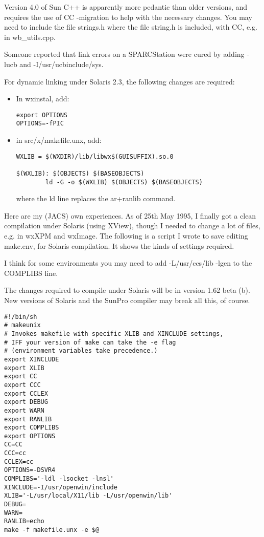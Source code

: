 Version 4.0 of Sun C++ is apparently more pedantic than
older versions, and requires the use of CC -migration to
help with the necessary changes. You may need to include the file strings.h
where the file string.h is included, with CC, e.g. in wb\_utils.cpp.

Someone reported that link errors on a SPARCStation were
cured by adding -lucb and -I/usr/ucbinclude/sys.

For dynamic linking under Solaris 2.3, the following
changes are required:

\begin{itemize}
\item In wxinstal, add:

\begin{verbatim}
export OPTIONS
OPTIONS=-fPIC
\end{verbatim}%
\item in src/x/makefile.unx, add:

\begin{verbatim}
WXLIB = $(WXDIR)/lib/libwx$(GUISUFFIX).so.0

$(WXLIB): $(OBJECTS) $(BASEOBJECTS)
      	ld -G -o $(WXLIB) $(OBJECTS) $(BASEOBJECTS)
\end{verbatim}

where the ld line replaces the ar+ranlib command.
\end{itemize}

Here are my (JACS) own experiences. As of 25th May 1995, I finally got a clean
compilation under Solaris (using XView), though I needed to change a lot
of files, e.g. in wxXPM and wxImage. The following is a script I wrote
to save editing make.env, for Solaris compilation. It shows the kinds of
settings required.

I think for some environments you may need to add -L/usr/ccs/lib -lgen
to the COMPLIBS line.

The changes required to compile under Solaris will be in version 1.62 beta (b).
New versions of Solaris and the SunPro compiler may break all this, of course.

\begin{verbatim}
#!/bin/sh
# makeunix
# Invokes makefile with specific XLIB and XINCLUDE settings,
# IFF your version of make can take the -e flag
# (environment variables take precedence.)
export XINCLUDE
export XLIB
export CC
export CCC
export CCLEX
export DEBUG
export WARN
export RANLIB
export COMPLIBS
export OPTIONS
CC=CC
CCC=cc
CCLEX=cc
OPTIONS=-DSVR4
COMPLIBS='-ldl -lsocket -lnsl'
XINCLUDE=-I/usr/openwin/include
XLIB='-L/usr/local/X11/lib -L/usr/openwin/lib'
DEBUG=
WARN=
RANLIB=echo
make -f makefile.unx -e $@
\end{verbatim}

